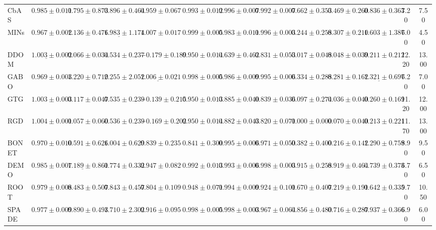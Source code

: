 \begin{table}
{\begin{tabular}{lcccccccccccc}
CbAS & $0.985 \pm 0.011$ & $0.795 \pm 0.873$ & $0.896 \pm 0.464$ & $0.959 \pm 0.067$ & $0.993 \pm 0.012$ & $0.996 \pm 0.007$ & $0.992 \pm 0.007$ & $0.662 \pm 0.353$ & $0.469 \pm 0.260$ & $0.836 \pm 0.363$ & 7.20 & 7.50 \\
MINs & $0.967 \pm 0.002$ & $1.136 \pm 0.476$ & $\underline{1.983 \pm 1.174}$ & $\mathbf{1.007 \pm 0.017}$ & $0.999 \pm 0.005$ & $0.983 \pm 0.011$ & $0.996 \pm 0.003$ & $0.244 \pm 0.258$ & $0.307 \pm 0.210$ & $\mathbf{1.603 \pm 1.387}$ & 6.00 & 4.50 \\
DDOM & $\underline{1.003 \pm 0.002}$ & $0.066 \pm 0.034$ & $0.534 \pm 0.237$ & $-0.179 \pm 0.189$ & $0.950 \pm 0.014$ & $0.639 \pm 0.462$ & $0.831 \pm 0.053$ & $0.017 \pm 0.048$ & $0.048 \pm 0.039$ & $0.211 \pm 0.212$ & 12.20 & 13.00 \\
GABO & $0.969 \pm 0.003$ & $\mathbf{1.220 \pm 0.710}$ & $\mathbf{2.255 \pm 2.052}$ & $\underline{1.006 \pm 0.021}$ & $0.998 \pm 0.005$ & $0.986 \pm 0.009$ & $0.995 \pm 0.006$ & $0.334 \pm 0.288$ & $0.281 \pm 0.162$ & $\underline{1.321 \pm 0.697}$ & 6.20 & 7.00 \\
GTG & $1.003 \pm 0.003$ & $0.117 \pm 0.047$ & $0.535 \pm 0.239$ & $-0.139 \pm 0.215$ & $0.950 \pm 0.013$ & $0.885 \pm 0.040$ & $0.839 \pm 0.036$ & $0.097 \pm 0.274$ & $0.036 \pm 0.040$ & $0.260 \pm 0.169$ & 11.20 & 12.00 \\
RGD & $\mathbf{1.004 \pm 0.001}$ & $0.057 \pm 0.060$ & $0.536 \pm 0.239$ & $-0.169 \pm 0.202$ & $0.950 \pm 0.014$ & $0.882 \pm 0.043$ & $0.820 \pm 0.071$ & $0.000 \pm 0.000$ & $0.070 \pm 0.040$ & $0.213 \pm 0.221$ & 11.70 & 13.00 \\
BONET & $0.970 \pm 0.010$ & $0.591 \pm 0.626$ & $1.004 \pm 0.629$ & $0.839 \pm 0.235$ & $0.841 \pm 0.300$ & $0.995 \pm 0.006$ & $0.971 \pm 0.050$ & $0.382 \pm 0.400$ & $0.216 \pm 0.142$ & $1.290 \pm 0.759$ & 8.90 & 9.50 \\
DEMO & $0.985 \pm 0.007$ & $\underline{1.189 \pm 0.861}$ & $0.774 \pm 0.332$ & $0.947 \pm 0.082$ & $0.992 \pm 0.013$ & $0.993 \pm 0.006$ & $0.998 \pm 0.003$ & $0.915 \pm 0.258$ & $0.919 \pm 0.464$ & $0.739 \pm 0.373$ & 6.70 & 6.50 \\
ROOT & $0.979 \pm 0.008$ & $0.483 \pm 0.507$ & $0.843 \pm 0.457$ & $0.804 \pm 0.109$ & $0.948 \pm 0.071$ & $0.994 \pm 0.009$ & $0.924 \pm 0.101$ & $0.670 \pm 0.407$ & $0.219 \pm 0.191$ & $0.642 \pm 0.335$ & 9.70 & 10.50 \\
SPADE & $0.977 \pm 0.009$ & $0.890 \pm 0.493$ & $1.710 \pm 2.302$ & $0.916 \pm 0.095$ & $0.998 \pm 0.005$ & $0.998 \pm 0.003$ & $0.967 \pm 0.064$ & $0.856 \pm 0.480$ & $0.716 \pm 0.287$ & $0.937 \pm 0.366$ & 6.90 & 6.00 \\

\end{tabular}}
\end{table}
